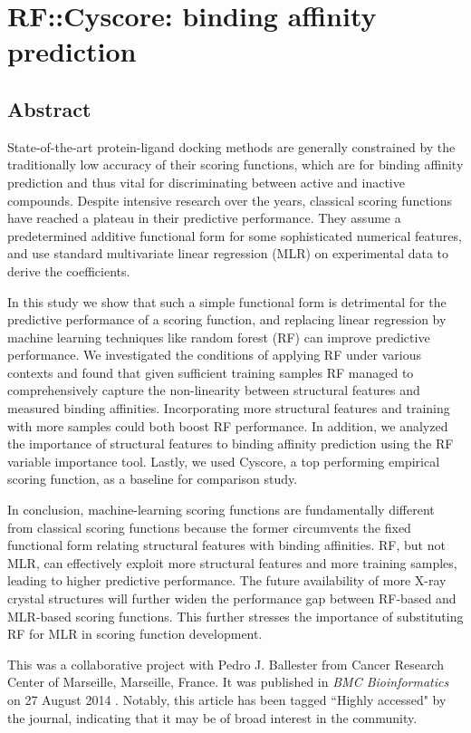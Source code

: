 \chapter{RF::Cyscore: binding affinity prediction}

\section{Abstract}

State-of-the-art protein-ligand docking methods are generally constrained by the traditionally low accuracy of their scoring functions, which are for binding affinity prediction and thus vital for discriminating between active and inactive compounds. Despite intensive research over the years, classical scoring functions have reached a plateau in their predictive performance. They assume a predetermined additive functional form for some sophisticated numerical features, and use standard multivariate linear regression (MLR) on experimental data to derive the coefficients.

In this study we show that such a simple functional form is detrimental for the predictive performance of a scoring function, and replacing linear regression by machine learning techniques like random forest (RF) can improve predictive performance. We investigated the conditions of applying RF under various contexts and found that given sufficient training samples RF managed to comprehensively capture the non-linearity between structural features and measured binding affinities. Incorporating more structural features and training with more samples could both boost RF performance. In addition, we analyzed the importance of structural features to binding affinity prediction using the RF variable importance tool. Lastly, we used Cyscore, a top performing empirical scoring function, as a baseline for comparison study.

In conclusion, machine-learning scoring functions are fundamentally different from classical scoring functions because the former circumvents the fixed functional form relating structural features with binding affinities. RF, but not MLR, can effectively exploit more structural features and more training samples, leading to higher predictive performance. The future availability of more X-ray crystal structures will further widen the performance gap between RF-based and MLR-based scoring functions. This further stresses the importance of substituting RF for MLR in scoring function development.

This was a collaborative project with Pedro J. Ballester from Cancer Research Center of Marseille, Marseille, France. It was published in \textit{BMC Bioinformatics} on 27 August 2014 \citep{1432}. Notably, this article has been tagged ``Highly accessed" by the journal, indicating that it may be of broad interest in the community.

